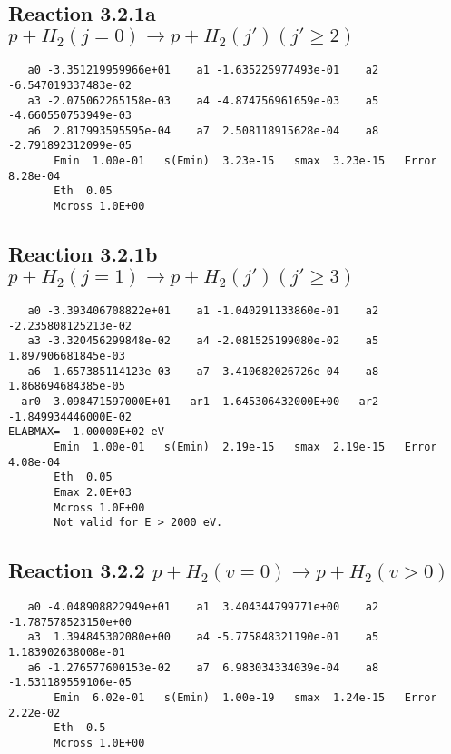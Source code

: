 \documentclass[12pt,dvipdfm]{article}
\begin{document}
\newpage
\subsection{
Reaction 3.2.1a $   p + H_2(j=0) \rightarrow p + H_2(j')   (j' \geq 2)$}


\begin{small}\begin{verbatim}
   a0 -3.351219959966e+01    a1 -1.635225977493e-01    a2 -6.547019337483e-02
   a3 -2.075062265158e-03    a4 -4.874756961659e-03    a5 -4.660550753949e-03
   a6  2.817993595595e-04    a7  2.508118915628e-04    a8 -2.791892312099e-05
       Emin  1.00e-01   s(Emin)  3.23e-15   smax  3.23e-15   Error  8.28e-04
       Eth  0.05
       Mcross 1.0E+00
\end{verbatim}\end{small}







\newpage
\subsection{
Reaction 3.2.1b $   p + H_2(j=1) \rightarrow p + H_2(j')   (j' \geq 3)$}


\begin{small}\begin{verbatim}
   a0 -3.393406708822e+01    a1 -1.040291133860e-01    a2 -2.235808125213e-02
   a3 -3.320456299848e-02    a4 -2.081525199080e-02    a5  1.897906681845e-03
   a6  1.657385114123e-03    a7 -3.410682026726e-04    a8  1.868694684385e-05
  ar0 -3.098471597000E+01   ar1 -1.645306432000E+00   ar2 -1.849934446000E-02
ELABMAX=  1.00000E+02 eV
       Emin  1.00e-01   s(Emin)  2.19e-15   smax  2.19e-15   Error  4.08e-04
       Eth  0.05
       Emax 2.0E+03
       Mcross 1.0E+00
       Not valid for E > 2000 eV.
\end{verbatim}\end{small}


\newpage
\subsection{
Reaction 3.2.2 $   p + H_2(v=0) \rightarrow p + H_2(v > 0)$}


\begin{small}\begin{verbatim}
   a0 -4.048908822949e+01    a1  3.404344799771e+00    a2 -1.787578523150e+00
   a3  1.394845302080e+00    a4 -5.775848321190e-01    a5  1.183902638008e-01
   a6 -1.276577600153e-02    a7  6.983034334039e-04    a8 -1.531189559106e-05
       Emin  6.02e-01   s(Emin)  1.00e-19   smax  1.24e-15   Error  2.22e-02
       Eth  0.5
       Mcross 1.0E+00
\end{verbatim}\end{small}
\end{document}
